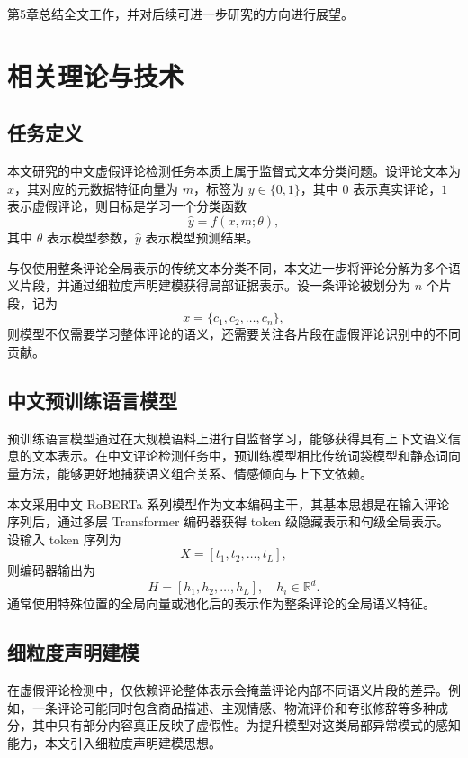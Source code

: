\documentclass[UTF8,oneside,openright,fontset=none]{ctexbook}
\numberwithin{equation}{chapter}
\begin{document}
第5章总结全文工作，并对后续可进一步研究的方向进行展望。

\chapter{相关理论与技术}

\section{任务定义}
本文研究的中文虚假评论检测任务本质上属于监督式文本分类问题。设评论文本为 $x$，其对应的元数据特征向量为 $m$，标签为 $y\in\{0,1\}$，其中 $0$ 表示真实评论，$1$ 表示虚假评论，则目标是学习一个分类函数
\begin{equation}
  \hat{y} = f(x,m;\theta),
\end{equation}
其中 $\theta$ 表示模型参数，$\hat{y}$ 表示模型预测结果。

与仅使用整条评论全局表示的传统文本分类不同，本文进一步将评论分解为多个语义片段，并通过细粒度声明建模获得局部证据表示。设一条评论被划分为 $n$ 个片段，记为
\begin{equation}
  x = \{c_1,c_2,\ldots,c_n\},
\end{equation}
则模型不仅需要学习整体评论的语义，还需要关注各片段在虚假评论识别中的不同贡献。

\section{中文预训练语言模型}
预训练语言模型通过在大规模语料上进行自监督学习，能够获得具有上下文语义信息的文本表示。在中文评论检测任务中，预训练模型相比传统词袋模型和静态词向量方法，能够更好地捕获语义组合关系、情感倾向与上下文依赖。

本文采用中文 RoBERTa 系列模型作为文本编码主干，其基本思想是在输入评论序列后，通过多层 Transformer 编码器获得 token 级隐藏表示和句级全局表示。设输入 token 序列为
\begin{equation}
  X = [t_1,t_2,\ldots,t_L],
\end{equation}
则编码器输出为
\begin{equation}
  H = [h_1,h_2,\ldots,h_L],\quad h_i\in\mathbb{R}^{d}.
\end{equation}
通常使用特殊位置的全局向量或池化后的表示作为整条评论的全局语义特征。

\section{细粒度声明建模}
在虚假评论检测中，仅依赖评论整体表示会掩盖评论内部不同语义片段的差异。例如，一条评论可能同时包含商品描述、主观情感、物流评价和夸张修辞等多种成分，其中只有部分内容真正反映了虚假性。为提升模型对这类局部异常模式的感知能力，本文引入细粒度声明建模思想。
\end{document}
